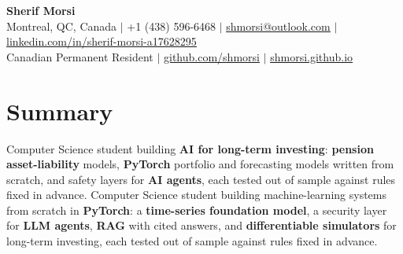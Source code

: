 \newcommand{\githubLink}[1]{\href{#1}{\textbf{\underline{GitHub}}}}
\newcommand{\skillLine}[2]{\textbf{#1}{: #2} \\ \vspace{-1pt}}



\begin{center}
    {\Huge \textbf{Sherif Morsi}} \\ \vspace{-2pt}
\small Montreal, QC, Canada $|$
+1 (438) 596-6468 $|$
\href{mailto:shmorsi@outlook.com}{\underline{shmorsi@outlook.com}} $|$
\href{https://www.linkedin.com/in/sherif-morsi-a17628295}{\underline{linkedin.com/in/sherif-morsi-a17628295}} \\
\small Canadian Permanent Resident $|$
\href{https://github.com/shmorsi}{\underline{github.com/shmorsi}} $|$
\href{https://shmorsi.github.io/}{\underline{shmorsi.github.io}}
\end{center}
\vspace{-14pt} %

\section{Summary}
\small{
\ifcase\resumevariant
Computer Science student building \textbf{AI for long-term investing}: \textbf{pension asset-liability} models, \textbf{PyTorch} portfolio and forecasting models written from scratch, and safety layers for \textbf{AI agents}, each tested out of sample against rules fixed in advance.
\or
Computer Science student building machine-learning systems from scratch in \textbf{PyTorch}: a \textbf{time-series foundation model}, a security layer for \textbf{LLM agents}, \textbf{RAG} with cited answers, and \textbf{differentiable simulators} for long-term investing, each tested out of sample against rules fixed in advance.
\fi
}

